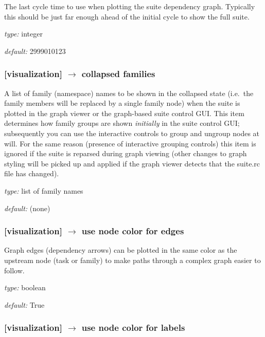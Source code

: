 The last cycle time to use when plotting the suite dependency graph.
Typically this should be just far enough ahead of the initial cycle to
show the full suite.

\begin{myitemize}
    \item {\em type:} integer
    \item {\em default:} 2999010123
\end{myitemize}

\subsubsection[collapsed families]{[visualization] $\rightarrow$ collapsed families}

A list of family (namespace) names to be shown in the collapsed state
(i.e.\ the family members will be replaced by a single family node) when
the suite is plotted in the graph viewer or the graph-based suite
control GUI. This item determines how family groups are shown 
{\em initially} in the suite control GUI; subsequently you can use the
interactive controls to group and ungroup nodes at will. For the same
reason (presence of interactive grouping controls) this item is ignored
if the suite is reparsed during graph viewing (other changes to graph
styling will be picked up and applied if the graph viewer detects that
the suite.rc file has changed). 

\begin{myitemize}
    \item {\em type:} list of family names
    \item {\em default:} (none)
\end{myitemize}

\subsubsection[use node color for edges]{[visualization] $\rightarrow$ use node color for edges}

Graph edges (dependency arrows) can be plotted in the same color
as the upstream node (task or family) to make paths through a complex
graph easier to follow.

\begin{myitemize}
    \item {\em type:} boolean
    \item {\em default:} True
\end{myitemize}

\subsubsection[use node color for labels]{[visualization] $\rightarrow$ use node color for labels}

